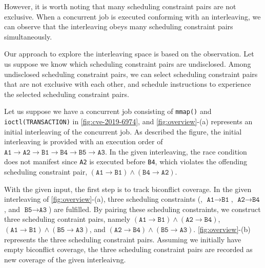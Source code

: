 However, it is worth noting that many scheduling constraint pairs are
not exclusive.
%
When a concurrent job is executed conforming with an interleaving, we
can observe that the interleaving obeys many scheduling constraint
pairs simultaneously.
%

Our approach to explore the interleaving space is based on the
observation.
%
Let us suppose we know which scheduling constraint pairs are
undisclosed. Among undisclosed scheduling constraint pairs, we can
select scheduling constraint pairs that are not exclusive with each
other, and schedule instructions to experience the selected
scheduling constraint pairs.
%


%
Let us suppose we have a concurrent job consisting of \texttt{mmap()}
and \texttt{ioctl(TRANSACTION)} in \autoref{fig:cve-2019-6974}, and
\autoref{fig:overview}-(a) represents an initial interleaving of the
concurrent job.
%
As described the figure, the initial interleaving is provided with an
execution order of
$\texttt{A1} \rightarrow \texttt{A2} \rightarrow \texttt{B1}
\rightarrow \texttt{B4} \rightarrow \texttt{B5} \rightarrow
\texttt{A3}$.
%
In the given interleaving, the race condition does not manifest since
\texttt{A2} is executed before \texttt{B4}, which violates the
offending scheduling constraint pair,
$(\texttt{A1} \rightarrow \texttt{B1}) \wedge (\texttt{B4} \rightarrow
\texttt{A2})$.

With the given input, the first step is to track biconflict coverage.
In the given interleaving of \autoref{fig:overview}-(a), three
scheduling constraints (\ie, $\texttt{A1} \rightarrow \texttt{B1}$,
$\texttt{A2} \rightarrow \texttt{B4}$, and
$\texttt{B5} \rightarrow \texttt{A3}$) are fulfilled.
%
By pairing these scheduling constraints, we construct three scheduling
contraint pairs, namely
$(\texttt{A1} \rightarrow \texttt{B1}) \wedge (\texttt{A2} \rightarrow
\texttt{B4})$,
$(\texttt{A1} \rightarrow \texttt{B1}) \wedge (\texttt{B5} \rightarrow
\texttt{A3})$, and
$(\texttt{A2} \rightarrow \texttt{B4}) \wedge (\texttt{B5} \rightarrow
\texttt{A3})$.
%
\autoref{fig:overview}-(b) represents the three scheduling constraint
pairs.
%
Assuming we initially have empty biconflict coverage, the three
scheduling constraint pairs are recorded as new coverage of the given
interleaivng.



